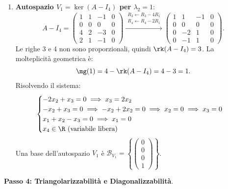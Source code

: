 \begin{dimostrazione}
\begin{enumerate}
    \item \textbf{Autospazio $V_1 = \ker(A - I_4)$ per $\lambda_2 = 1$}:
    \begin{equation}
        A - I_4 = \begin{pmatrix}
            1 & 1 & -1 & 0 \\
            0 & 0 & 0 & 0 \\
            4 & 2 & -3 & 0 \\
            2 & 1 & -1 & 0
        \end{pmatrix}
        \xrightarrow{\substack{R_3 \leftarrow R_3 - 4R_1 \\ R_4 \leftarrow R_4 - 2R_1}}
        \begin{pmatrix}
            1 & 1 & -1 & 0 \\
            0 & 0 & 0 & 0 \\
            0 & -2 & 1 & 0 \\
            0 & -1 & 1 & 0
        \end{pmatrix}.
    \end{equation}
    Le righe 3 e 4 non sono proporzionali, quindi $\rk(A - I_4) = 3$.
    La molteplicità geometrica è:
    \begin{equation}
        \mg(1) = 4 - \rk(A - I_4) = 4 - 3 = 1.
    \end{equation}
    Risolvendo il sistema:
    \begin{equation}
        \begin{cases}
            -2x_2 + x_3 = 0 \implies x_3 = 2x_2 \\
            -x_2 + x_3 = 0 \implies -x_2 + 2x_2 = 0 \implies x_2 = 0 \implies x_3 = 0 \\
            x_1 + x_2 - x_3 = 0 \implies x_1 = 0 \\
            x_4 \in \R \text{ (variabile libera)}
        \end{cases}
    \end{equation}
    Una base dell'autospazio $V_1$ è $\mathcal{B}_{V_1} = \left\{ \begin{pmatrix} 0 \\ 0 \\ 0 \\ 1 \end{pmatrix} \right\}$.
\end{enumerate}

\textbf{Passo 4: Triangolarizzabilità e Diagonalizzabilità}.


\end{dimostrazione}
